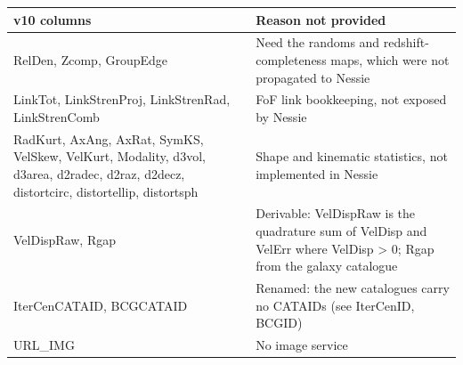 \begin{tabular}{p{6cm}p{8cm}}
\hline
v10 columns & Reason not provided \\
\hline
RelDen, Zcomp, GroupEdge & Need the randoms and redshift-completeness maps, which were not propagated to Nessie \\
LinkTot, LinkStrenProj, LinkStrenRad, LinkStrenComb & FoF link bookkeeping, not exposed by Nessie \\
RadKurt, AxAng, AxRat, SymKS, VelSkew, VelKurt, Modality, d3vol, d3area, d2radec, d2raz, d2decz, distortcirc, distortellip, distortsph & Shape and kinematic statistics, not implemented in Nessie \\
VelDispRaw, Rgap & Derivable: VelDispRaw is the quadrature sum of VelDisp and VelErr where VelDisp > 0; Rgap from the galaxy catalogue \\
IterCenCATAID, BCGCATAID & Renamed: the new catalogues carry no CATAIDs (see IterCenID, BCGID) \\
URL\_IMG & No image service \\
\hline
\end{tabular}
